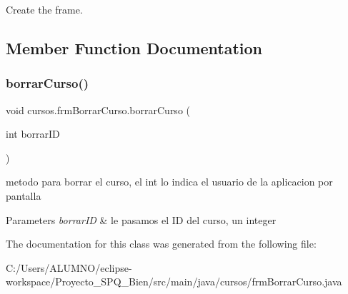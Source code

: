 Create the frame. 

\subsection{Member Function Documentation}
\mbox{\label{classcursos_1_1frm_borrar_curso_adb924894795aa125f156446080aa3bd6}} 
\subsubsection{\texorpdfstring{borrar\+Curso()}{borrarCurso()}}
{\footnotesize\ttfamily void cursos.\+frm\+Borrar\+Curso.\+borrar\+Curso (\begin{DoxyParamCaption}\item[{int}]{borrar\+ID }\end{DoxyParamCaption})}

metodo para borrar el curso, el int lo indica el usuario de la aplicacion por pantalla


\begin{DoxyParams}{Parameters}
{\em borrar\+ID} & le pasamos el ID del curso, un integer \\
\hline
\end{DoxyParams}


The documentation for this class was generated from the following file\+:\begin{DoxyCompactItemize}
\item 
C\+:/\+Users/\+A\+L\+U\+M\+N\+O/eclipse-\/workspace/\+Proyecto\+\_\+\+S\+P\+Q\+\_\+Bien/src/main/java/cursos/frm\+Borrar\+Curso.\+java\end{DoxyCompactItemize}
